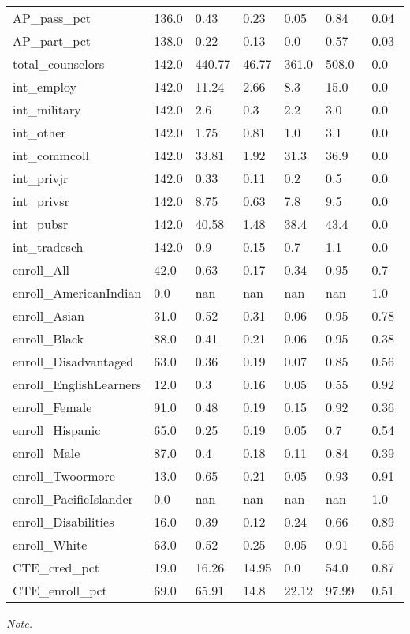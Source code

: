 \begin{threeparttable}
\begin{tabular}{ p{0.1\linewidth} p{0.1\linewidth} p{0.1\linewidth} p{0.1\linewidth} p{0.08\linewidth} p{0.3\linewidth} p{0.3\linewidth}}
 AP_pass_pct &  136.0  &  0.43 & 0.23 & 0.05 & 0.84 & 0.04  \\ 
 AP_part_pct &  138.0  &  0.22 & 0.13 & 0.0 & 0.57 & 0.03  \\ 
 total_counselors &  142.0  &  440.77 & 46.77 & 361.0 & 508.0 & 0.0  \\ 
 int_employ &  142.0  &  11.24 & 2.66 & 8.3 & 15.0 & 0.0  \\ 
 int_military &  142.0  &  2.6 & 0.3 & 2.2 & 3.0 & 0.0  \\ 
 int_other &  142.0  &  1.75 & 0.81 & 1.0 & 3.1 & 0.0  \\ 
 int_commcoll &  142.0  &  33.81 & 1.92 & 31.3 & 36.9 & 0.0  \\ 
 int_privjr &  142.0  &  0.33 & 0.11 & 0.2 & 0.5 & 0.0  \\ 
 int_privsr &  142.0  &  8.75 & 0.63 & 7.8 & 9.5 & 0.0  \\ 
 int_pubsr &  142.0  &  40.58 & 1.48 & 38.4 & 43.4 & 0.0  \\ 
 int_tradesch &  142.0  &  0.9 & 0.15 & 0.7 & 1.1 & 0.0  \\ 
 enroll_All &  42.0  &  0.63 & 0.17 & 0.34 & 0.95 & 0.7  \\ 
 enroll_AmericanIndian &  0.0  &  nan & nan & nan & nan & 1.0  \\ 
 enroll_Asian &  31.0  &  0.52 & 0.31 & 0.06 & 0.95 & 0.78  \\ 
 enroll_Black &  88.0  &  0.41 & 0.21 & 0.06 & 0.95 & 0.38  \\ 
 enroll_Disadvantaged &  63.0  &  0.36 & 0.19 & 0.07 & 0.85 & 0.56  \\ 
 enroll_EnglishLearners &  12.0  &  0.3 & 0.16 & 0.05 & 0.55 & 0.92  \\ 
 enroll_Female &  91.0  &  0.48 & 0.19 & 0.15 & 0.92 & 0.36  \\ 
 enroll_Hispanic &  65.0  &  0.25 & 0.19 & 0.05 & 0.7 & 0.54  \\ 
 enroll_Male &  87.0  &  0.4 & 0.18 & 0.11 & 0.84 & 0.39  \\ 
 enroll_Twoormore &  13.0  &  0.65 & 0.21 & 0.05 & 0.93 & 0.91  \\ 
 enroll_PacificIslander &  0.0  &  nan & nan & nan & nan & 1.0  \\ 
 enroll_Disabilities &  16.0  &  0.39 & 0.12 & 0.24 & 0.66 & 0.89  \\ 
 enroll_White &  63.0  &  0.52 & 0.25 & 0.05 & 0.91 & 0.56  \\ 
 CTE_cred_pct &  19.0  &  16.26 & 14.95 & 0.0 & 54.0 & 0.87  \\ 
 CTE_enroll_pct &  69.0  &  65.91 & 14.8 & 22.12 & 97.99 & 0.51  \\ 
\midrule
\end{tabular}
\begin{tablenotes}
    {\small
        \textit{Note.} 

     }
\end{tablenotes}
\end{threeparttable}
